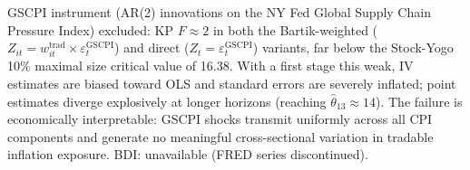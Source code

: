 \begin{table}[htbp]
\begin{threeparttable}
\begin{tablenotes}[flushleft]
GSCPI instrument (AR(2) innovations on the NY Fed Global Supply Chain
Pressure Index) excluded: KP $F \approx 2$ in both the Bartik-weighted
($Z_{it} = w^{\text{trad}}_{it} \times \varepsilon^{\text{GSCPI}}_t$) and
direct ($Z_t = \varepsilon^{\text{GSCPI}}_t$) variants, far below the
Stock-Yogo 10\% maximal size critical value of 16.38.
With a first stage this weak, IV estimates are biased toward OLS and
standard errors are severely inflated; point estimates diverge explosively
at longer horizons (reaching $\hat{\theta}_{13} \approx 14$).
The failure is economically interpretable: GSCPI shocks transmit
uniformly across all CPI components and generate no meaningful
cross-sectional variation in tradable inflation exposure.
BDI: unavailable (FRED series discontinued).
\end{tablenotes}
\end{threeparttable}
\end{table}
